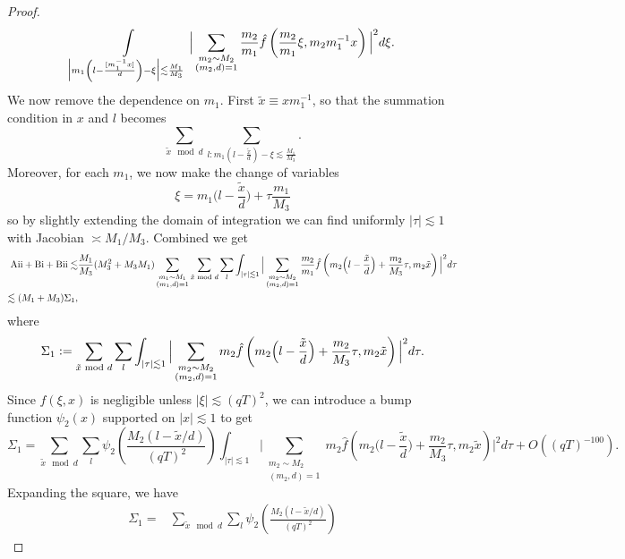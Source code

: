 \begin{proof}
\begin{align*}
            \int\displaylimits_{\Big|m_1\left(l-\frac{[m_1^{-1}x]}{d}\right)- \xi \Big|\lesssim \frac{M_1}{M_3}}
            \Big|
                \sum_{\substack{m_2\sim M_2\\(m_2,d)=1}} \frac{m_2}{m_1}\hat{f}\left(\frac{m_2}{m_1}\xi, m_2m_1^{-1}x\right) 
                \Big|^2 d\xi.\\
    \end{align*}
    We now remove the dependence on $m_1$. First $\tilde{x} \equiv x m_1^{-1}$, so that the summation condition in $x$ and $l$ becomes \[
        \sum_{\tilde{x} \mod d} \sum_{l : m_1\left(l-\frac{\tilde{x}}{d}\right)- \xi \lesssim \frac{M_1}{M_3} }.
    \]
    Moreover, for each $m_1$, we now make the change of variables \[
    \xi = m_1\Big(l-\frac{\tilde{x}}{d}\Big)+\tau\frac{m_1}{M_3}
    \]
    so by slightly extending the domain of integration we can find uniformly $|\tau|\lesssim 1$ with Jacobian $\asymp M_1/M_3$.
    Combined we get
    \begin{align*}
        \rm{Aii}+{Bi}+{Bii} \lesssim &
        \frac{M_1}{M_3}(M_3^2+M_3M_1)
        \sum_{\substack{m_1\sim M_1\\(m_1,d)=1}}\sum_{\tilde{x} \mod d} \sum_{l  } 
        \int_{|\tau|\lesssim 1}
        \Big|
            \sum_{\substack{m_2\sim M_2\\(m_2,d)=1}} \frac{m_2}{m_1}\hat{f}\left(m_2\Big(l-\frac{\tilde{x}}{d}\Big)+\frac{m_2}{M_3}\tau, m_2\tilde{x}\right) 
            \Big|^2 d\tau\\
            \lesssim (M_1+M_3) \Sigma_1,
    \end{align*}
    where\[
    \Sigma_1 \defeq \sum_{\tilde{x} \mod d} \sum_{l  } 
    \int_{|\tau|\lesssim 1}
    \Big|
        \sum_{\substack{m_2\sim M_2\\(m_2,d)=1}} {m_2}\hat{f}\left(m_2\Big(l-\frac{\tilde{x}}{d}\Big)+\frac{m_2}{M_3}\tau, m_2\tilde{x}\right) 
        \Big|^2d\tau.
    \]
    Since $\hat{f}(\xi,x)$ is negligible unless $|\xi|\lesssim (qT)^2$, we can introduce a bump function $\psi_2(x)$ supported on $|x|\lesssim 1$ to get \[
        \Sigma_1 = \sum_{\tilde{x} \mod d} \sum_{l  } \psi_2\left(\frac{M_2(l-\tilde{x}/d)}{(qT)^2}\right)
        \int_{|\tau|\lesssim 1}
        \Big|
            \sum_{\substack{m_2\sim M_2\\(m_2,d)=1}} {m_2}\hat{f}\left(m_2\Big(l-\frac{\tilde{x}}{d}\Big)+\frac{m_2}{M_3}\tau, m_2\tilde{x}\right) 
            \Big|^2d\tau+O((qT)^{-100}).
    \]
    Expanding the square, we have \begin{align*}
        \Sigma_1= & \sum_{\tilde{x} \mod d} \sum_{l  }  \psi_2\left(\frac{M_2(l-\tilde{x}/d)}{(qT)^2}\right)

\end{align*}
\end{proof}
